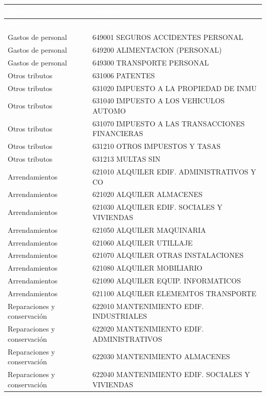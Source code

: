 \documentclass[11pt,letterpaper]{article}
\newcommand{\cabecera}{\rowcolor{maxamPrimario}}
\newcommand{\tth}[1]{\textcolor{white}{\textbf{#1}}}
\begin{document}
\begin{xltabular}{\textwidth}{L{5.2cm} Y}
\cabecera \tth{Grupo} & \tth{Cuenta} \\
\endfirsthead
\cabecera \tth{Grupo} & \tth{Cuenta} \\
\endhead
{} Gastos de personal & 649001 SEGUROS ACCIDENTES PERSONAL \\
Gastos de personal & 649200 ALIMENTACION (PERSONAL) \\
 Gastos de personal & 649300 TRANSPORTE PERSONAL \\
Otros tributos & 631006 PATENTES \\
 Otros tributos & 631020 IMPUESTO A LA PROPIEDAD DE INMU \\
Otros tributos & 631040 IMPUESTO A LOS VEHICULOS AUTOMO \\
 Otros tributos & 631070 IMPUESTO A LAS TRANSACCIONES FINANCIERAS \\
Otros tributos & 631210 OTROS IMPUESTOS Y TASAS \\
 Otros tributos & 631213 MULTAS SIN \\
Arrendamientos & 621010 ALQUILER EDIF. ADMINISTRATIVOS Y CO \\
 Arrendamientos & 621020 ALQUILER ALMACENES \\
Arrendamientos & 621030 ALQUILER EDIF. SOCIALES Y VIVIENDAS \\
 Arrendamientos & 621050 ALQUILER MAQUINARIA \\
Arrendamientos & 621060 ALQUILER UTILLAJE \\
 Arrendamientos & 621070 ALQUILER OTRAS INSTALACIONES \\
Arrendamientos & 621080 ALQUILER MOBILIARIO \\
 Arrendamientos & 621090 ALQUILER EQUIP. INFORMATICOS \\
Arrendamientos & 621100 ALQUILER ELEMEMTOS TRANSPORTE \\
 Reparaciones y conservación & 622010 MANTENIMIENTO EDIF. INDUSTRIALES \\
Reparaciones y conservación & 622020 MANTENIMIENTO EDIF. ADMINISTRATIVOS \\
 Reparaciones y conservación & 622030 MANTENIMIENTO ALMACENES \\
Reparaciones y conservación & 622040 MANTENIMIENTO EDIF. SOCIALES Y VIVIENDAS \\

\end{xltabular}
\end{document}
